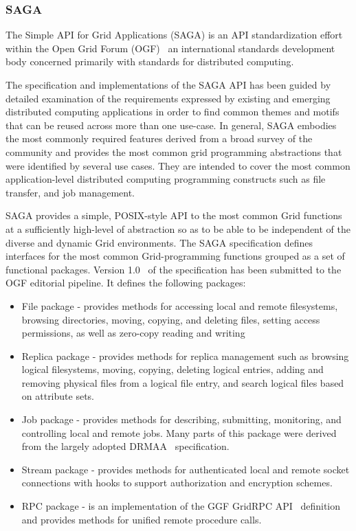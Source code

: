 \documentclass[conference,final]{IEEEtran}
\begin{document}
\subsubsection{SAGA}

The Simple API for Grid Applications (SAGA) is an API standardization
effort within the Open Grid Forum (OGF)~\cite{ogf_web} an
international standards development body concerned primarily with
standards for distributed computing.

The specification and implementations of the SAGA API has been guided
by detailed examination of the requirements expressed by existing and
emerging distributed computing applications in order to find common
themes and motifs that can be reused across more than one use-case.
In general, SAGA embodies the most commonly required features derived
from a broad survey of the community and provides the most common grid
programming abstractions that were identified by several use cases.
They are intended to cover the most common application-level
distributed computing programming constructs such as file transfer,
and job management.


SAGA provides a simple, POSIX-style API to the most common Grid
functions at a sufficiently high-level of abstraction so as to be able
to be independent of the diverse and dynamic Grid environments.  The
SAGA specification defines interfaces for the most common
Grid-programming functions grouped as a set of functional packages.
Version 1.0~\cite{saga-core} of the specification has been submitted
to the OGF editorial pipeline.  It defines the following packages:

\begin{itemize}
\item File package - provides methods for accessing local and remote
  filesystems, browsing directories, moving, copying, and deleting
  files, setting access permissions, as well as zero-copy reading and
  writing
\item Replica package - provides methods for replica management such
  as browsing logical filesystems, moving, copying, deleting logical
  entries, adding and removing physical files from a logical file
  entry, and search logical files based on attribute sets.
\item Job package - provides methods for describing, submitting,
  monitoring, and controlling local and remote jobs. Many parts of
  this package were derived from the largely adopted
  DRMAA~\cite{drmaa_url} specification.
\item Stream package - provides methods for authenticated local and
  remote socket connections with hooks to support authorization and
  encryption schemes.
\item RPC package - is an implementation of the GGF GridRPC
  API~\cite{gridrpc_url} definition and provides methods for unified
  remote procedure calls.
\end{itemize}
\end{document}
